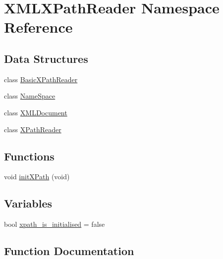 \hypertarget{namespaceXMLXPathReader}{}\section{X\+M\+L\+X\+Path\+Reader Namespace Reference}
\label{namespaceXMLXPathReader}
\subsection*{Data Structures}
\begin{DoxyCompactItemize}
\item 
class \mbox{\hyperlink{classXMLXPathReader_1_1BasicXPathReader}{Basic\+X\+Path\+Reader}}
\item 
class \mbox{\hyperlink{classXMLXPathReader_1_1NameSpace}{Name\+Space}}
\item 
class \mbox{\hyperlink{classXMLXPathReader_1_1XMLDocument}{X\+M\+L\+Document}}
\item 
class \mbox{\hyperlink{classXMLXPathReader_1_1XPathReader}{X\+Path\+Reader}}
\end{DoxyCompactItemize}
\subsection*{Functions}
\begin{DoxyCompactItemize}
\item 
void \mbox{\hyperlink{namespaceXMLXPathReader_a3eaf7514c0fa46eb783802d88bbebb97}{init\+X\+Path}} (void)
\end{DoxyCompactItemize}
\subsection*{Variables}
\begin{DoxyCompactItemize}
\item 
bool \mbox{\hyperlink{namespaceXMLXPathReader_a2622cebb93cd752913bf8e9db036f339}{xpath\+\_\+is\+\_\+initialised}} = false
\end{DoxyCompactItemize}


\subsection{Function Documentation}
\mbox{\label{namespaceXMLXPathReader_a3eaf7514c0fa46eb783802d88bbebb97}} 
